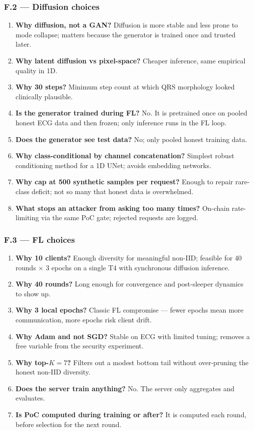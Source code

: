 \documentclass[11pt,a4paper]{article}
\begin{document}
\subsubsection{F.2 --- Diffusion choices}
\begin{enumerate}
\item \textbf{Why diffusion, not a GAN?} Diffusion is more stable and less prone to mode collapse; matters because the generator is trained once and trusted later.
\item \textbf{Why latent diffusion vs pixel-space?} Cheaper inference, same empirical quality in 1D.
\item \textbf{Why 30 steps?} Minimum step count at which QRS morphology looked clinically plausible.
\item \textbf{Is the generator trained during FL?} No. It is pretrained once on pooled honest ECG data and then frozen; only inference runs in the FL loop.
\item \textbf{Does the generator see test data?} No; only pooled honest training data.
\item \textbf{Why class-conditional by channel concatenation?} Simplest robust conditioning method for a 1D UNet; avoids embedding networks.
\item \textbf{Why cap at 500 synthetic samples per request?} Enough to repair rare-class deficit; not so many that honest data is overwhelmed.
\item \textbf{What stops an attacker from asking too many times?} On-chain rate-limiting via the same PoC gate; rejected requests are logged.
\end{enumerate}

\subsubsection{F.3 --- FL choices}
\begin{enumerate}
\item \textbf{Why 10 clients?} Enough diversity for meaningful non-IID; feasible for 40 rounds $\times$ 3 epochs on a single T4 with synchronous diffusion inference.
\item \textbf{Why 40 rounds?} Long enough for convergence and post-sleeper dynamics to show up.
\item \textbf{Why 3 local epochs?} Classic FL compromise --- fewer epochs mean more communication, more epochs risk client drift.
\item \textbf{Why Adam and not SGD?} Stable on ECG with limited tuning; removes a free variable from the security experiment.
\item \textbf{Why top-$K=7$?} Filters out a modest bottom tail without over-pruning the honest non-IID diversity.
\item \textbf{Does the server train anything?} No. The server only aggregates and evaluates.
\item \textbf{Is PoC computed during training or after?} It is computed each round, before selection for the next round.
\end{enumerate}
\end{document}
